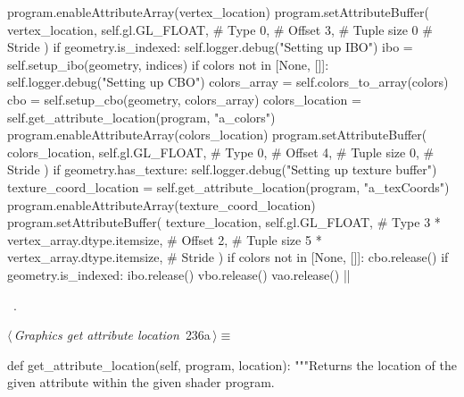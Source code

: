 \documentclass[%
    a4paper,    %
    justified,  %
    nobib,      %
    openany     %
]{tufte-book}
\makeatletter
\renewcommand{\label}[1]{\@tufte@label{##1}}%
\makeatother
\begin{document}
\begin{fullwidth}
\begin{flushleft}
\begin{minipage}{\linewidth}
\begin{pythoncode}
program.enableAttributeArray(vertex_location)
program.setAttributeBuffer(
    vertex_location,
    self.gl.GL_FLOAT,  # Type
    0,                 # Offset
    3,                 # Tuple size
    0                  # Stride
)
if geometry.is_indexed:
    self.logger.debug("Setting up IBO")
    ibo = self.setup_ibo(geometry, indices)
if colors not in [None, []]:
    self.logger.debug("Setting up CBO")
    colors_array = self.colors_to_array(colors)
    cbo = self.setup_cbo(geometry, colors_array)
    colors_location = self.get_attribute_location(program, "a_colors")
    program.enableAttributeArray(colors_location)
    program.setAttributeBuffer(
        colors_location,
        self.gl.GL_FLOAT,  # Type
        0,                 # Offset
        4,                 # Tuple size
        0,                 # Stride
    )
if geometry.has_texture:
    self.logger.debug("Setting up texture buffer")
    texture_coord_location = self.get_attribute_location(program, "a_texCoords")
    program.enableAttributeArray(texture_coord_location)
    program.setAttributeBuffer(
        texture_location,
        self.gl.GL_FLOAT,                 # Type
        3 * vertex_array.dtype.itemsize,  # Offset
        2,                                # Tuple size
        5 * vertex_array.dtype.itemsize,  # Stride
    )
if colors not in [None, []]:
    cbo.release()
if geometry.is_indexed:
    ibo.release()
vbo.release()
vao.release()
|\NWsep|
\end{pythoncode}
\vspace{1.5ex}
\footnotesize
\begin{list}{}{\setlength{\itemsep}{-\parsep}\setlength{\itemindent}{-\leftmargin}}
\item \NWtxtMacroRefIn\ .

\item{}
\end{list}
\end{minipage}\vspace{4ex}
\end{flushleft}
\begin{flushleft} \small
\begin{minipage}{\linewidth}\label{scrap252}\raggedright\small
{} $\langle\,${\itshape Graphics get attribute location}\nobreak\ {\footnotesize {236a}}$\,\rangle\equiv$
\vspace{-1ex}
\begin{pythoncode}
def get_attribute_location(self, program, location):
    """Returns the location of the given attribute within the given shader
    program.



\end{pythoncode}
\end{minipage}
\end{flushleft}
\end{fullwidth}
\end{document}
